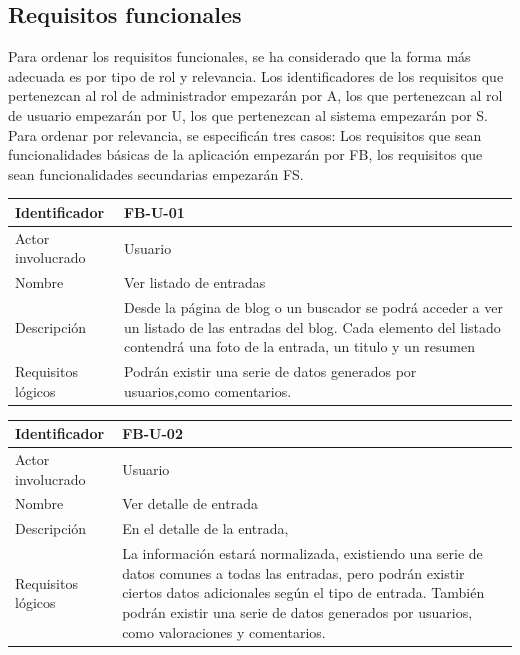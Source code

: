 \subsection{Requisitos funcionales}

Para ordenar los requisitos funcionales, se ha considerado que la forma más adecuada es por tipo de rol y relevancia. Los identificadores de los requisitos que pertenezcan al rol de administrador empezarán por A, los que pertenezcan al rol de usuario empezarán por U, los que pertenezcan al sistema empezarán por S. Para ordenar por relevancia, se especificán tres casos: Los requisitos que sean funcionalidades básicas de la aplicación empezarán por FB, los requisitos que sean funcionalidades secundarias empezarán FS.

\vspace{5 mm}


\begin{table}[h!]
\centering
\begin{tabular}{|p{3cm}|p{10cm}|}
\hline
Identificador & FB-U-01 \\ \hline
Actor involucrado & Usuario \\ \hline
Nombre & Ver listado de entradas \\ \hline
Descripción & Desde la página de blog o un buscador se podrá acceder a ver un listado de las entradas del blog. Cada elemento del listado contendrá una foto de la entrada, un titulo y un resumen \\ \hline
Requisitos lógicos & Podrán existir una serie de datos generados por usuarios,como comentarios. \\ \hline
\end{tabular}
\end{table}


\begin{table}[h!]
\centering
\begin{tabular}{|p{3cm}|p{10cm}|}
\hline
Identificador & FB-U-02 \\ \hline
Actor involucrado & Usuario \\ \hline
Nombre & Ver detalle de entrada \\ \hline
Descripción & En el detalle de la entrada,  \\ \hline
Requisitos lógicos & La información estará normalizada, existiendo una serie de datos comunes a todas las entradas, pero podrán existir ciertos datos adicionales según el tipo de entrada. También podrán existir una serie de datos generados por usuarios, como valoraciones y comentarios. \\ \hline
\end{tabular}
\end{table}


